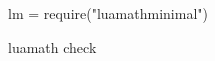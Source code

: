 \documentclass[11pt,twoside]{article}
\begin{document}
\begin{luacode*}
lm = require("luamathminimal")
\end{luacode*}
luamath check
\end{document}
